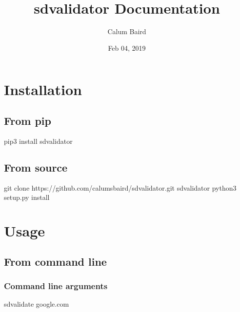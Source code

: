 \documentclass[a4paper,10pt,english,openany,oneside]{sphinxmanual}
\title{sdvalidator Documentation}
\date{Feb 04, 2019}
\author{Calum Baird}
\begin{document}
\pagestyle{empty}
\sphinxmaketitle
\pagestyle{plain}
\sphinxtableofcontents
\pagestyle{normal}
\label{\detokenize{index::doc}}



\chapter{Installation}
\label{\detokenize{installation:installation}}\label{\detokenize{installation::doc}}

\section{From pip}
\label{\detokenize{installation:from-pip}}
\begin{sphinxVerbatim}[commandchars=\\\{\}]
 pip3 install sdvalidator
\end{sphinxVerbatim}


\section{From source}
\label{\detokenize{installation:from-source}}
\begin{sphinxVerbatim}[commandchars=\\\{\}]
 git clone https://github.com/calumsbaird/sdvalidator.git
  sdvalidator
 python3 setup.py install
\end{sphinxVerbatim}


\chapter{Usage}
\label{\detokenize{usage:usage}}\label{\detokenize{usage::doc}}

\section{From command line}
\label{\detokenize{usage:from-command-line}}

\subsection{Command line arguments}
\label{\detokenize{usage:command-line-arguments}}
\begin{sphinxVerbatim}[commandchars=\\\{\}]
 sdvalidate google.com
\end{sphinxVerbatim}
\end{document}
